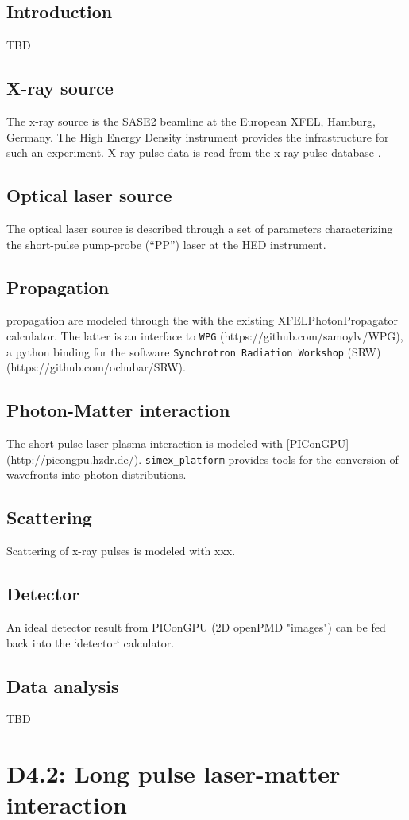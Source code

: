 \documentclass[a4paper]{article}
\begin{document}
\subsection{Introduction}
TBD
\subsection{X-ray source}
The x-ray source is the SASE2 beamline at the European XFEL, Hamburg, Germany. The High Energy Density instrument \cite{} provides the infrastructure
for such an experiment. X-ray pulse data is read from the x-ray pulse database \cite{}.
\subsection{Optical laser source}
The optical laser source is described through a set of parameters characterizing the short-pulse pump-probe (``PP'') laser at the HED instrument.
\subsection{Propagation}
propagation are modeled through the with the existing XFELPhotonPropagator calculator. The latter is an interface
to \texttt{WPG} (https://github.com/samoylv/WPG), a python binding for the software \texttt{Synchrotron Radiation Workshop} (SRW)
(https://github.com/ochubar/SRW).
\subsection{Photon-Matter interaction}
The short-pulse laser-plasma interaction is modeled with [PIConGPU](http://picongpu.hzdr.de/).
\texttt{simex\_platform} provides tools for the conversion of wavefronts into photon distributions.
\subsection{Scattering}
Scattering of x-ray pulses is modeled with xxx.
\subsection{Detector}
An ideal detector result from PIConGPU (2D openPMD "images") can be fed back into the `detector` calculator.
\subsection{Data analysis}
TBD

\section{D4.2: Long pulse laser-matter interaction\label{sec:long_pulse}}
\end{document}
